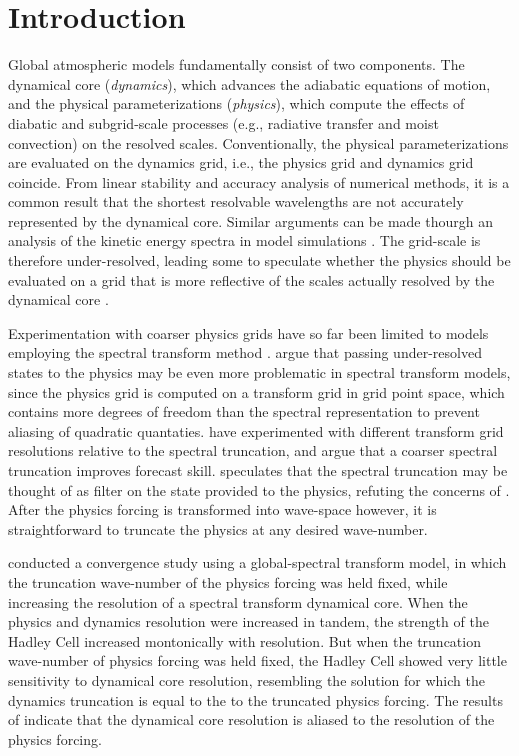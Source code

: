 \documentclass{agujournal}
\begin{document}
\section{Introduction}

Global atmospheric models fundamentally consist of two components. The dynamical core ({\em{dynamics}}), which advances the adiabatic equations of motion, and the physical parameterizations ({\em{physics}}), which compute the effects of diabatic and subgrid-scale processes (e.g., radiative transfer and moist convection) on the resolved scales. Conventionally, the physical parameterizations are evaluated on the dynamics grid, i.e., the physics grid and dynamics grid coincide. From linear stability and accuracy analysis of numerical methods, it is a common result that the shortest resolvable wavelengths are not accurately represented by the dynamical core. Similar arguments can be made thourgh an analysis of the kinetic energy spectra in model simulations \citep{S2011LNCSE}. The grid-scale is therefore under-resolved, leading some to speculate whether the physics should be evaluated on a grid that is more reflective of the scales actually resolved by the dynamical core \citep{LH1997MWR,W2007JMSJ,S2011LNCSE}.

Experimentation with coarser physics grids have so far been limited to models employing the spectral transform method \citep{LH1997MWR,W1999T}. \cite{LH1997MWR} argue that passing under-resolved states to the physics may be even more problematic in spectral transform models, since the physics grid is computed on a transform grid in grid point space, which contains more degrees of freedom than the spectral representation to prevent aliasing of quadratic quantaties. \cite{W2014PTRSL} have experimented with different transform grid resolutions relative to the spectral truncation, and argue that a coarser spectral truncation improves forecast skill. \cite{W2014PTRSL} speculates that the spectral truncation may be thought of as filter on the state provided to the physics, refuting the concerns of \cite{LH1997MWR}. After the physics forcing is transformed into wave-space however, it is straightforward to truncate the physics at any desired wave-number. 

\cite{W1999T} conducted a convergence study using a global-spectral transform model, in which the truncation wave-number of the physics forcing was held fixed, while increasing the resolution of a spectral transform dynamical core. When the physics and dynamics resolution were increased in tandem, the strength of the Hadley Cell increased montonically with resolution. But when the truncation wave-number of physics forcing was held fixed, the Hadley Cell showed very little sensitivity to dynamical core resolution, resembling the solution for which the dynamics truncation is equal to the to the truncated physics forcing. The results of \cite{W1999T} indicate that the dynamical core resolution is aliased to the resolution of the physics forcing. 
\end{document}
